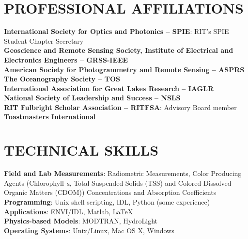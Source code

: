 \documentclass[11pt]{res} %
\begin{document}
\begin{resume}
\section{PROFESSIONAL AFFILIATIONS}
\vspace{0.1in}
{\bf International Society for Optics and Photonics -- SPIE}: RIT's SPIE Student Chapter Secretary 
\vspace{0.1in}\\
{\bf Geoscience and Remote Sensing Society, Institute of Electrical and Electronics Engineers -- GRSS-IEEE}
\vspace{0.1in}\\
{\bf American Society for Photogrammetry and Remote Sensing -- ASPRS}
\vspace{0.1in}\\
{\bf The Oceanography Society -- TOS}
\vspace{0.1in}\\
{\bf International Association for Great Lakes Research -- IAGLR}
\vspace{0.1in}\\
{\bf National Society of Leadership and Success -- NSLS}
\vspace{0.1in}\\
{\bf RIT Fulbright Scholar Association -- RITFSA}: Advisory Board member
\vspace{0.1in}\\
{\bf Toastmasters International}

\section{TECHNICAL SKILLS}
\vspace{0.1in}
{\bf Field and Lab Measurements}: Radiometric Measurements, Color Producing Agents (Chlorophyll-{\it a}, Total Suspended Solids (TSS) and Colored Dissolved Organic Matters (CDOM)) Concentrations and Absorption Coefficients
\vspace{0.1in}\\
{\bf Programming}: Unix shell scripting, IDL, Python (some experience)
\vspace{0.1in}\\
{\bf Applications}: ENVI/IDL, Matlab, LaTeX
\vspace{0.1in}\\
{\bf Physics-based Models}: MODTRAN, HydroLight
\vspace{0.1in}\\
{\bf Operating Systems}: Unix/Linux, Mac OS X, Windows\\



\end{resume}
\end{document}
